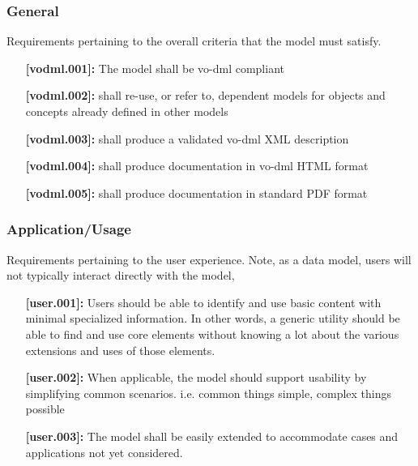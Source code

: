 \documentclass[11pt,a4paper]{ivoa}
\begin{document}
\subsubsection{General}
Requirements pertaining to the overall criteria that the model must satisfy.
  \begin{itemize}
    \item [\textbf{[vodml.001]:}] The model shall be vo-dml compliant
    \item [\textbf{[vodml.002]:}] shall re-use, or refer to, dependent models for objects and concepts already defined in other models
    \item [\textbf{[vodml.003]:}] shall produce a validated vo-dml XML description
    \item [\textbf{[vodml.004]:}] shall produce documentation in vo-dml HTML format
    \item [\textbf{[vodml.005]:}] shall produce documentation in standard PDF format
  \end{itemize}

\subsubsection{Application/Usage}
Requirements pertaining to the user experience.  Note, as a data model, users will not typically interact directly with the model,
  \begin{itemize}
    \item [\textbf{[user.001]:}] Users should be able to identify and use basic content with minimal specialized information. 
      In other words, a generic utility should be able to find and use core elements without knowing a lot about the various extensions and uses of those elements.
    \item [\textbf{[user.002]:}] When applicable, the model should support usability by simplifying common scenarios. i.e. common things simple, complex things possible
    \item [\textbf{[user.003]:}] The model shall be easily extended to accommodate cases and applications not yet considered.
  \end{itemize}
\end{document}
